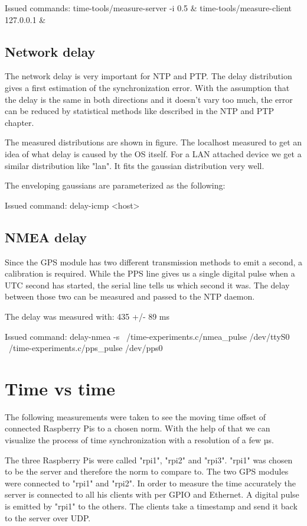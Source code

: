 Issued commands:
time-tools/measure-server -i 0.5 \&
time-tools/measure-client 127.0.0.1 \&

\subsection{Network delay}

The network delay is very important for NTP and PTP. The delay distribution gives a first estimation of the synchronization error. With the assumption that the delay is the same in both directions and it doesn’t vary too much, the error can be reduced by statistical methods like described in the NTP and PTP chapter.


The measured distributions are shown in figure. The localhost measured to get an idea of what delay is caused by the OS itself. For a LAN attached device we get a similar distribution like "lan". It fits the gaussian distribution very well.

The enveloping gaussians are parameterized as the following:


Issued command:
delay-icmp <host>

\subsection{NMEA delay}

Since the GPS module has two different transmission methods to emit a second, a calibration is required. While the PPS line gives us a single digital pulse when a UTC second has started, the serial line tells us which second it was. The delay between those two can be measured and passed to the NTP daemon.

The delay was measured with: 435 +/- 89 ms

Issued command:
delay-nmea -s ~/time-experiments.c/nmea\_pulse /dev/ttyS0 ~/time-experiments.c/pps\_pulse /dev/pps0

\section{Time vs time}

The following measurements were taken to see the moving time offset of connected Raspberry Pis to a chosen norm. With the help of that we can visualize the process of time synchronization with a resolution of a few µs.

The three Raspberry Pis were called "rpi1", "rpi2" and "rpi3". "rpi1" was chosen to be the server and therefore the norm to compare to. The two GPS modules were connected to "rpi1" and "rpi2". In order to measure the time accurately the server is connected to all his clients with per GPIO and Ethernet. A digital pulse is emitted by "rpi1" to the others. The clients take a timestamp and send it back to the server over UDP.


